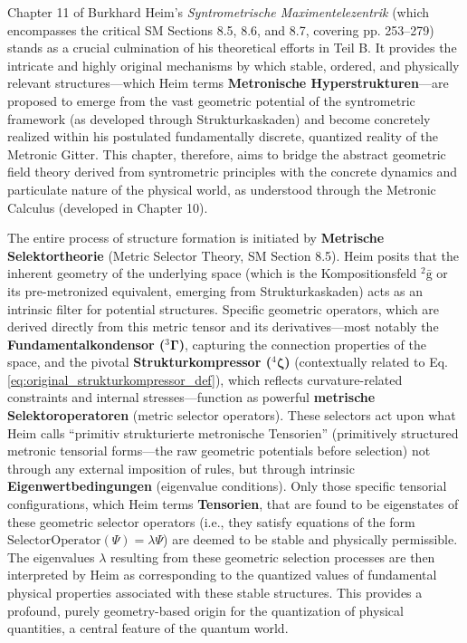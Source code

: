 \documentclass[12pt]{article}
\newcommand{\q}[1]{\enquote{#1}}
\newcommand{\kompositionsfeld}{{}^2\bar{\mathrm{g}}}
\newcommand{\fundamentalkondensor}{{}^3\bm{\Gamma}}
\newcommand{\strukturkompressor}{{}^4\bm{\zeta}}
\begin{document}
Chapter 11 of Burkhard Heim's \textit{Syntrometrische Maximentelezentrik} (which encompasses the critical SM Sections 8.5, 8.6, and 8.7, covering pp. 253–279) stands as a crucial culmination of his theoretical efforts in Teil B. It provides the intricate and highly original mechanisms by which stable, ordered, and physically relevant structures—which Heim terms \textbf{Metronische Hyperstrukturen}—are proposed to emerge from the vast geometric potential of the syntrometric framework (as developed through Strukturkaskaden) and become concretely realized within his postulated fundamentally discrete, quantized reality of the Metronic Gitter. This chapter, therefore, aims to bridge the abstract geometric field theory derived from syntrometric principles with the concrete dynamics and particulate nature of the physical world, as understood through the Metronic Calculus (developed in Chapter 10).

The entire process of structure formation is initiated by \textbf{Metrische Selektortheorie} (Metric Selector Theory, SM Section 8.5). Heim posits that the inherent geometry of the underlying space (which is the Kompositionsfeld \( \kompositionsfeld \) or its pre-metronized equivalent, emerging from Strukturkaskaden) acts as an intrinsic filter for potential structures. Specific geometric operators, which are derived directly from this metric tensor and its derivatives—most notably the \textbf{Fundamentalkondensor (\( \fundamentalkondensor \))}, capturing the connection properties of the space, and the pivotal \textbf{Strukturkompressor (\( \strukturkompressor \))} (contextually related to Eq. \eqref{eq:original_strukturkompressor_def}), which reflects curvature-related constraints and internal stresses—function as powerful \textbf{metrische Selektoroperatoren} (metric selector operators). These selectors act upon what Heim calls \q{primitiv strukturierte metronische Tensorien} (primitively structured metronic tensorial forms—the raw geometric potentials before selection) not through any external imposition of rules, but through intrinsic \textbf{Eigenwertbedingungen} (eigenvalue conditions). Only those specific tensorial configurations, which Heim terms \textbf{Tensorien}, that are found to be eigenstates of these geometric selector operators (i.e., they satisfy equations of the form \( \text{SelectorOperator}(\Psi) = \lambda\Psi \)) are deemed to be stable and physically permissible. The eigenvalues \( \lambda \) resulting from these geometric selection processes are then interpreted by Heim as corresponding to the quantized values of fundamental physical properties associated with these stable structures. This provides a profound, purely geometry-based origin for the quantization of physical quantities, a central feature of the quantum world.
\end{document}
